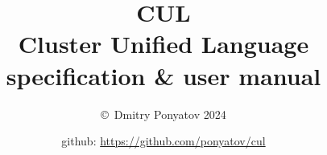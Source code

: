 

\title{{\Huge \textbf{CUL}\\Cluster Unified Language}\\specification \& user manual}
\author{\copyright\ Dmitry Ponyatov  2024}
\date{github: \url{https://github.com/ponyatov/cul}}


\maketitle
\tableofcontents
\bigskip{}
\clearpage\secdown

\secdown


\secup




